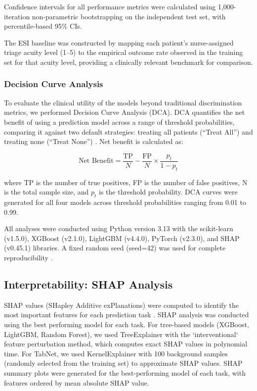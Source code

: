 \documentclass[harvard,article]{frontiersinFPHY_FAMS}
\begin{document}
Confidence intervals for all performance metrics were calculated using 1,000-iteration non-parametric bootstrapping on the independent test set, with percentile-based 95\% CIs.

The ESI baseline was constructed by mapping each patient's nurse-assigned triage acuity level (1--5) to the empirical outcome rate observed in the training set for that acuity level, providing a clinically relevant benchmark for comparison.

\subsubsection{Decision Curve Analysis}

To evaluate the clinical utility of the models beyond traditional discrimination metrics, we performed Decision Curve Analysis (DCA). DCA quantifies the net benefit of using a prediction model across a range of threshold probabilities, comparing it against two default strategies: treating all patients (``Treat All'') and treating none (``Treat None'') \cite{vickers2006}. Net benefit is calculated as:

\begin{equation}
\text{Net Benefit} = \frac{\text{TP}}{N} - \frac{\text{FP}}{N} \times \frac{p_t}{1 - p_t}
\end{equation}

where TP is the number of true positives, FP is the number of false positives, N is the total sample size, and \( p_t \) is the threshold probability. DCA curves were generated for all four models across threshold probabilities ranging from 0.01 to 0.99.

All analyses were conducted using Python version 3.13 with the scikit-learn (v1.5.0), XGBoost (v2.1.0), LightGBM (v4.4.0), PyTorch (v2.3.0), and SHAP (v0.45.1) libraries. A fixed random seed (seed=42) was used for complete reproducibility \cite{mcdermott2019}.

\subsection{Interpretability: SHAP Analysis}

SHAP values (SHapley Additive exPlanations) \cite{lundberg2017} were computed to identify the most important features for each prediction task \cite{feretzakis2024, slack2022}. SHAP analysis was conducted using the best performing model for each task. For tree-based models (XGBoost, LightGBM, Random Forest), we used TreeExplainer with the `interventional` feature perturbation method, which computes exact SHAP values in polynomial time. For TabNet, we used KernelExplainer with 100 background samples (randomly selected from the training set) to approximate SHAP values. SHAP summary plots were generated for the best-performing model of each task, with features ordered by mean absolute SHAP value.
\end{document}
